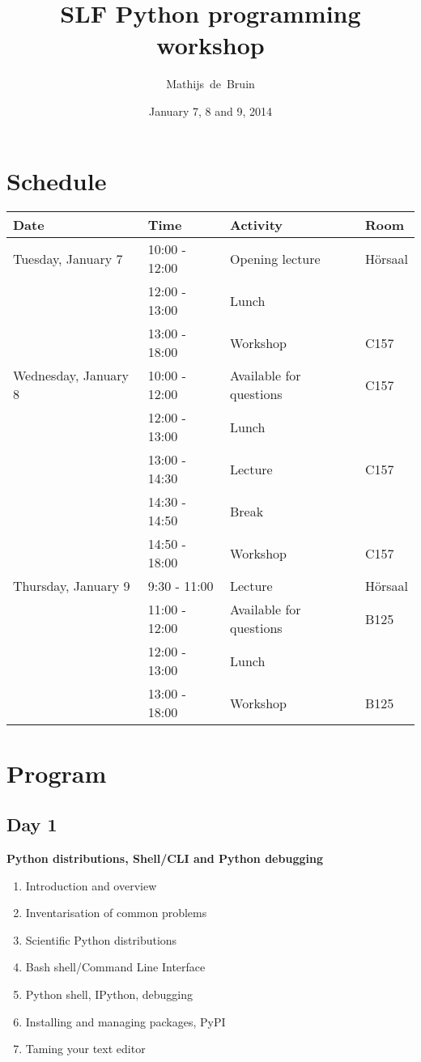 \documentclass[a4paper, 10pt]{article}
\author{Mathijs~de~Bruin}
\title{SLF Python programming workshop}
\date{January 7, 8 and 9, 2014}
\begin{document}
    \maketitle

    \section{Schedule}
        \begin{tabular}{l l l l}
            Date & Time & Activity & Room \\
            \hline \hline
            Tuesday, January 7 & 10:00 - 12:00 & Opening lecture & Hörsaal \\
            & 12:00 - 13:00 & Lunch & \\
            & 13:00 - 18:00 & Workshop & C157 \\
            \hline
            Wednesday, January 8 & 10:00 - 12:00 & Available for questions & C157 \\
            & 12:00 - 13:00 & Lunch & \\
            & 13:00 - 14:30 & Lecture & C157 \\
            & 14:30 - 14:50 & Break & \\
            & 14:50 - 18:00 & Workshop & C157 \\
            \hline
            Thursday, January 9 & 9:30 - 11:00 & Lecture & Hörsaal \\
            & 11:00 - 12:00 & Available for questions & B125 \\
            & 12:00 - 13:00 & Lunch & \\
            & 13:00 - 18:00 & Workshop & B125
        \end{tabular}

    \section{Program}
        \subsection{Day 1}
            {\bf Python distributions, Shell/CLI and Python debugging}

            \begin{enumerate}
                \item Introduction and overview
                \item Inventarisation of common problems
                \item Scientific Python distributions
                \item Bash shell/Command Line Interface
                \item Python shell, IPython, debugging
                \item Installing and managing packages, PyPI
                \item Taming your text editor
            \end{enumerate}
\end{document}
